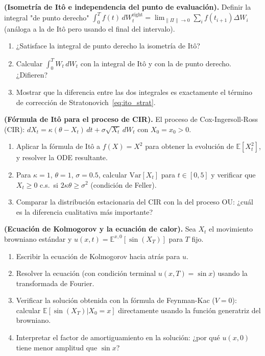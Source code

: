 \begin{ejercicio}
\textbf{(Isometría de Itô e independencia del punto de evaluación).}
Definir la integral "de punto derecho"
$\int_0^T f(t)\,dW_t^{\mathrm{right}} = \lim_{\|\Pi\|\to 0}\sum_i f(t_{i+1})
\Delta W_i$ (análoga a la de Itô pero usando el final del intervalo).
\begin{enumerate}[label=(\alph*)]
  \item ¿Satisface la integral de punto derecho la isometría de Itô?
  \item Calcular $\int_0^T W_t\,dW_t$ con la integral de Itô y con la de
        punto derecho. ¿Difieren?
  \item Mostrar que la diferencia entre las dos integrales es exactamente el
        término de corrección de Stratonovich~\eqref{eq:ito_strat}.
\end{enumerate}
\end{ejercicio}

\begin{ejercicio}
\textbf{(Fórmula de Itô para el proceso de CIR).}
El proceso de Cox-Ingersoll-Ross (CIR): $dX_t = \kappa(\theta-X_t)\,dt +
\sigma\sqrt{X_t}\,dW_t$ con $X_0 = x_0 > 0$.
\begin{enumerate}[label=(\alph*)]
  \item Aplicar la fórmula de Itô a $f(X) = X^2$ para obtener la evolución
        de $\mathbb{E}[X_t^2]$, y resolver la ODE resultante.
  \item Para $\kappa = 1$, $\theta = 1$, $\sigma = 0.5$, calcular
        $\mathrm{Var}[X_t]$ para $t \in [0,5]$ y verificar que $X_t \geq 0$
        c.s.\ si $2\kappa\theta \geq \sigma^2$ (condición de Feller).
  \item Comparar la distribución estacionaria del CIR con la del proceso OU:
        ¿cuál es la diferencia cualitativa más importante?
\end{enumerate}
\end{ejercicio}

\begin{ejercicio}
\textbf{(Ecuación de Kolmogorov y la ecuación de calor).}
Sea $X_t$ el movimiento browniano estándar y $u(x,t) = \mathbb{E}^{x,0}
[\sin(X_T)]$ para $T$ fijo.
\begin{enumerate}[label=(\alph*)]
  \item Escribir la ecuación de Kolmogorov hacia atrás para $u$.
  \item Resolver la ecuación (con condición terminal $u(x,T) = \sin x$) usando
        la transformada de Fourier.
  \item Verificar la solución obtenida con la fórmula de Feynman-Kac
        ($V = 0$): calcular $\mathbb{E}[\sin(X_T)|X_0 = x]$ directamente usando
        la función generatriz del browniano.
  \item Interpretar el factor de amortiguamiento en la solución: ¿por qué
        $u(x,0)$ tiene menor amplitud que $\sin x$?
\end{enumerate}
\end{ejercicio}

